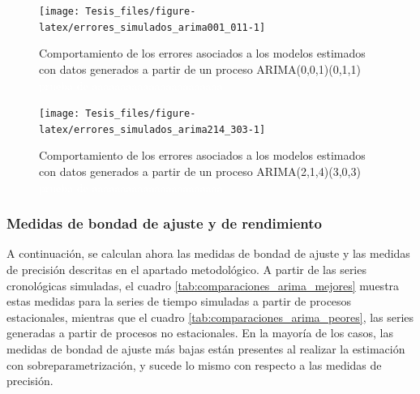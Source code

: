 \documentclass[
]{article}
\begin{document}
\begin{figure}[H]
\texttt{[image: Tesis\_files/figure-latex/errores\_simulados\_arima001\_011-1]} \caption{Comportamiento de los errores asociados a los modelos estimados con datos generados a partir de un proceso ARIMA(0,0,1)(0,1,1) \textcolor{white}{prueba de aaaaaaaaaaaaaaaaaaaaaaa}}\label{fig:errores_simulados_arima001_011}
\end{figure}

\begin{figure}[H]
\texttt{[image: Tesis\_files/figure-latex/errores\_simulados\_arima214\_303-1]} \caption{Comportamiento de los errores asociados a los modelos estimados con datos generados a partir de un proceso ARIMA(2,1,4)(3,0,3) \textcolor{white}{prueba de aaaaaaaaaaaaaaaaaaaaaaa}}\label{fig:errores_simulados_arima214_303}
\end{figure}

\subsubsection{Medidas de bondad de ajuste y de rendimiento}

A continuación, se calculan ahora las medidas de bondad de ajuste y las
medidas de precisión descritas en el apartado metodológico. A partir de
las series cronológicas simuladas, el cuadro
\ref{tab:comparaciones_arima_mejores} muestra estas medidas para la
series de tiempo simuladas a partir de procesos estacionales, mientras
que el cuadro \ref{tab:comparaciones_arima_peores}, las series generadas
a partir de procesos no estacionales. En la mayoría de los casos, las
medidas de bondad de ajuste más bajas están presentes al realizar la
estimación con sobreparametrización, y sucede lo mismo con respecto a
las medidas de precisión.
\end{document}
